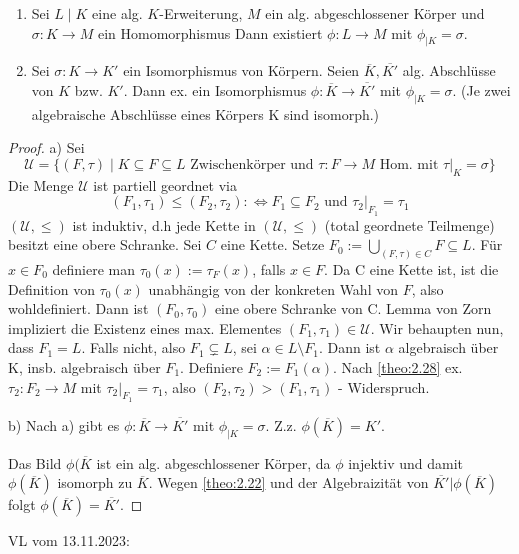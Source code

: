 \documentclass[../main.tex]{subfiles}
\begin{document}
\begin{theorem}[Fortsetzungssatz] \label{theo:2.31}
    \begin{enumerate}[label=(\alph*)]
        \item Sei $L \mid K$ eine alg. $K$-Erweiterung, $M$ ein alg. abgeschlossener Körper und $\sigma: K \rightarrow M$ ein Homomorphismus Dann existiert $\phi: L \rightarrow M$ mit $\phi_{|K} = \sigma$.
        \item Sei $\sigma: K \rightarrow K'$ ein Isomorphismus von Körpern. Seien $\overline{K}, \overline{K'}$ alg. Abschlüsse von $K$ bzw. $K'$. Dann ex. ein Isomorphismus $\phi: \overline{K} \rightarrow \overline{K'}$ mit $\phi_{|K} = \sigma$. (Je zwei algebraische Abschlüsse eines Körpers K sind isomorph.)
    \end{enumerate}
\end{theorem}
\begin{proof}
    a) Sei $$\mathcal{U} = \{(F,\tau) \mid K \subseteq F \subseteq L \text{ Zwischenkörper und } \tau: F \rightarrow M \text{ Hom. mit } \tau|_K = \sigma\}$$ Die Menge $\mathcal{U}$ ist partiell geordnet via 
    $$(F_1, \tau_1) \leq (F_2, \tau_2) :\Leftrightarrow F_1 \subseteq F_2 \text{ und } \tau_2|_{F_1} = \tau_1$$
    $(\mathcal{U},\leq)$ ist induktiv, d.h jede Kette in $(\mathcal{U},\leq)$ (total geordnete Teilmenge) besitzt eine obere Schranke. 
    Sei $C$ eine Kette. Setze $F_0 := \bigcup_{(F,\tau) \in C} F \subseteq L$. Für $x \in F_0$ definiere man $\tau_0(x) := \tau_F(x)$, falls $x \in F$. Da C eine Kette ist, ist die Definition von $\tau_0(x)$ unabhängig von der konkreten Wahl von $F$, also wohldefiniert. Dann ist $(F_0,\tau_0)$ eine obere Schranke von C. Lemma von Zorn impliziert die Existenz eines max. Elementes $(F_1, \tau_1) \in \mathcal{U}$. Wir behaupten nun, dass $F_1 = L$. Falls nicht, also $F_1 \subsetneq L$, sei $\alpha \in L\setminus F_1$. Dann ist $\alpha$ algebraisch über K, insb. algebraisch über $F_1$. Definiere $F_2 := F_1(\alpha)$. Nach \ref{theo:2.28} ex. $\tau_2: F_2 \rightarrow M$ mit $\tau_2|_{F_1} = \tau_1$, also $(F_2, \tau_2) > (F_1, \tau_1)$ - Widerspruch.

    b)
    Nach a) gibt es $\phi: \overline{K} \rightarrow \overline{K'}$ mit $\phi_{|K} = \sigma$. Z.z. $\phi(\overline{K}) = K'$.

    Das Bild $\phi(\overline{K}$ ist ein alg. abgeschlossener Körper, da $\phi$ injektiv und damit $\phi(\overline{K})$ isomorph zu $\overline{K}$.
    \TODO[Abbildung]
    Wegen \cref{theo:2.22} und der Algebraizität von $\overline{K'}|\phi(\overline{K})$ folgt $\phi(\overline{K}) = \overline{K'}$.
\end{proof}
\begin{flushright}
VL vom 13.11.2023:
\end{flushright}
\end{document}

